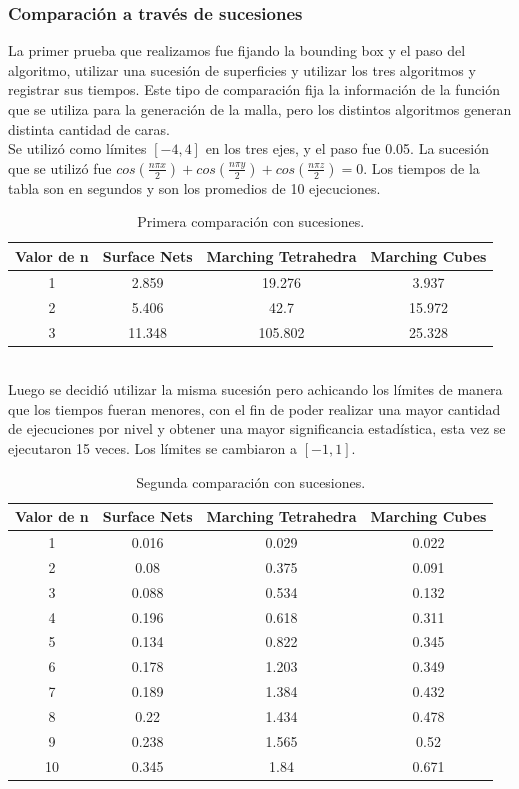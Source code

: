\documentclass[12pt]{article}
\begin{document}
\subsubsection{Comparación a través de sucesiones}
La primer prueba que realizamos fue fijando la bounding box y el paso del algoritmo, utilizar una sucesión de superficies y utilizar los tres algoritmos y registrar sus tiempos. Este tipo de comparación fija la información de la función que se utiliza para la generación de la malla, pero los distintos algoritmos generan distinta cantidad de caras.
\\Se utilizó como límites $[-4,4]$ en los tres ejes, y el paso fue 0.05. La sucesión que se utilizó fue $cos(\frac{n\pi x}{2}) + cos(\frac{n\pi y}{2}) +cos(\frac{n\pi z}{2}) =0$. Los tiempos de la tabla son en segundos y son los promedios de 10 ejecuciones.
\begin{table}[h!]
  \centering
  \label{tab:table1}
  \begin{tabular}{cccc}
    \toprule
    Valor de n & Surface Nets & Marching Tetrahedra & Marching Cubes\\
    \midrule
    1 & 2.859 & 19.276 & 3.937\\
    2 & 5.406 & 42.7 & 15.972\\
    3 & 11.348 & 105.802 & 25.328\\
    \bottomrule
  \end{tabular}
  \caption{Primera comparación con sucesiones.}
\end{table}
\\Luego se decidió utilizar la misma sucesión pero achicando los límites de manera que los tiempos fueran menores, con el fin de poder realizar una mayor cantidad de ejecuciones por nivel y obtener una mayor significancia estadística, esta vez se ejecutaron 15 veces. Los límites se cambiaron a $[-1,1]$. \\
\begin{table}[h!]
  \centering
  \label{tab:table1}
  \begin{tabular}{cccc}
    \toprule
    Valor de n & Surface Nets & Marching Tetrahedra & Marching Cubes\\
    \midrule
    1 & 0.016 & 0.029 & 0.022\\
    2 & 0.08 & 0.375 & 0.091\\
    3 & 0.088 & 0.534 & 0.132\\
    4 & 0.196 & 0.618 & 0.311\\
    5 & 0.134 & 0.822 & 0.345\\
    6 & 0.178 & 1.203 & 0.349\\
    7 & 0.189 & 1.384 & 0.432\\
    8 & 0.22 & 1.434 & 0.478\\
    9 & 0.238 & 1.565 & 0.52\\
    10 & 0.345 & 1.84 & 0.671\\
    \bottomrule
  \end{tabular}
  \caption{Segunda comparación con sucesiones.}
\end{table}
\end{document}
